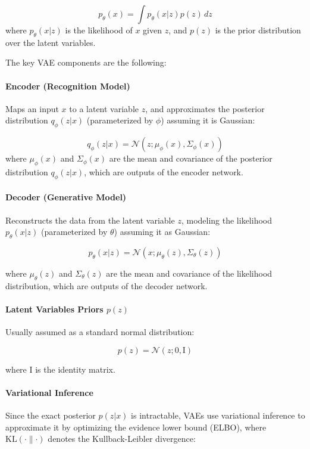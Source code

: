 \documentclass{ieeeaccess}
\begin{document}
\begin{equation}
p_\theta(x) = \int p_\theta(x | z) p(z) \, dz
\end{equation}
where $p_\theta(x | z)$ is the likelihood of $x$ given $z$, and $p(z)$ is the prior distribution over the latent variables.

The key VAE components are the following:

\paragraph{Encoder (Recognition Model)}
Maps an input $x$ to a latent variable $z$, and approximates the posterior distribution $q_\phi(z | x)$ (parameterized by $\phi$) assuming it is Gaussian:

\begin{equation}
q_\phi(z | x) = \mathcal{N}(z; \mu_\phi(x), \Sigma_\phi(x))
\end{equation}
where $\mu_\phi(x)$ and $\Sigma_\phi(x)$ are the mean and covariance of the posterior distribution $q_\phi(z | x)$, which are outputs of the encoder network.

\paragraph{Decoder (Generative Model)}
Reconstructs the data from the latent variable $z$, modeling the likelihood $p_\theta(x | z)$ (parameterized by $\theta$) assuming it as Gaussian:

\begin{equation}
p_\theta(x | z) = \mathcal{N}(x; \mu_\theta(z), \Sigma_\theta(z))
\end{equation}

where $\mu_\theta(z)$ and $\Sigma_\theta(z)$ are the mean and covariance of the likelihood distribution, which are outputs of the decoder network.

\paragraph{Latent Variables Priors $p(z)$}
Usually assumed as a standard normal distribution:

\begin{equation}
p(z) = \mathcal{N}(z; 0, \mathrm{I})
\end{equation}

where $\mathrm{I}$ is the identity matrix.

\paragraph{Variational Inference} Since the exact posterior $p(z | x)$ is intractable, VAEs use variational inference to approximate it by optimizing the evidence lower bound (ELBO), where $\text{KL}(\cdot \parallel \cdot)$ denotes the Kullback-Leibler divergence:
\end{document}

